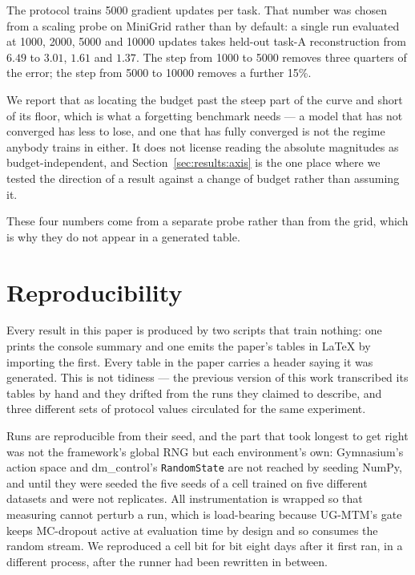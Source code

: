 The protocol trains 5000 gradient updates per task. That number was chosen from
a scaling probe on MiniGrid rather than by default: a single run evaluated at
1000, 2000, 5000 and 10000 updates takes held-out task-A reconstruction from
$6.49$ to $3.01$, $1.61$ and $1.37$. The step from 1000 to 5000 removes three
quarters of the error; the step from 5000 to 10000 removes a further 15\%.

We report that as locating the budget past the steep part of the curve and
short of its floor, which is what a forgetting benchmark needs --- a model that
has not converged has less to lose, and one that has fully converged is not the
regime anybody trains in either. It does not license reading the absolute
magnitudes as budget-independent, and Section~\ref{sec:results:axis} is the one
place where we tested the direction of a result against a change of budget
rather than assuming it.

These four numbers come from a separate probe rather than from the grid, which
is why they do not appear in a generated table.

\section{Reproducibility}
\label{sec:appendix:reproducibility}

Every result in this paper is produced by two scripts that train nothing: one
prints the console summary and one emits the paper's tables in \LaTeX{} by
importing the first. Every table in the paper carries a header saying it was
generated. This is not tidiness --- the previous version of this work
transcribed its tables by hand and they drifted from the runs they claimed to
describe, and three different sets of protocol values circulated for the same
experiment.

Runs are reproducible from their seed, and the part that took longest to get
right was not the framework's global RNG but each environment's own: Gymnasium's
action space and dm\_control's \texttt{RandomState} are not reached by seeding
NumPy, and until they were seeded the five seeds of a cell trained on five
different datasets and were not replicates. All instrumentation is wrapped so
that measuring cannot perturb a run, which is load-bearing because UG-MTM's gate
keeps MC-dropout active at evaluation time by design and so consumes the random
stream. We reproduced a cell bit for bit eight days after it first ran,
in a different process, after the runner had been rewritten in between.

